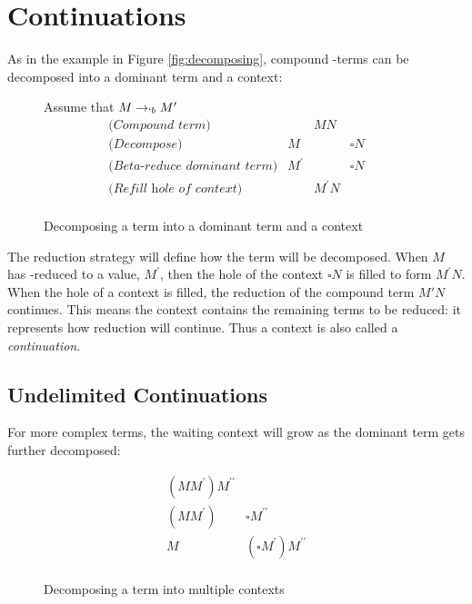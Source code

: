 \section{Continuations}
 
  As in the example in Figure \ref{fig:decomposing}, 
  compound \lam-terms can be decomposed into a dominant term and a context:
  \begin{figure}[H]\label{fig:decomposing-lambda}
    \hspace{1cm}Assume that $M \rightarrow_{`b} M^\prime$
    \[
    \begin{array}{lrcl}
    \textit{(Compound term)}&& MN \\
    \textit{(Decompose)}&M && \square N \\
    \textit{(Beta-reduce dominant term)}& M^\prime && \square N \\
    \textit{(Refill hole of context)}&& M^\prime N \\
    \end{array}
    \]
  \caption{Decomposing a term into a dominant term and a context}
  \end{figure}
  The reduction strategy will define how the term will be decomposed.
  When $M$ has \bta-reduced to a value, $M^\prime$, then the hole of the context $\square N$ is filled to form $M^\prime N$. 
  When the hole of a context is filled, the reduction of the compound term $M'N$ continues.
  This means the context contains the remaining terms to be reduced: it represents how reduction will continue. 
  Thus a context is also called a \emph{continuation}.
 
  \subsection{Undelimited Continuations} 
 
  For more complex terms, the waiting context will grow as the dominant term gets further decomposed:
  
  \begin{figure}[H]
    \[
    \begin{array}{ll}
      (MM^\prime) M^{\prime\prime} \\
      (MM^\prime) & \square M^{\prime\prime} \\
      M & (\square M^\prime) M^{\prime\prime} \\
    \end{array}
    \]
  \caption{Decomposing a term into multiple contexts}
  \end{figure}

